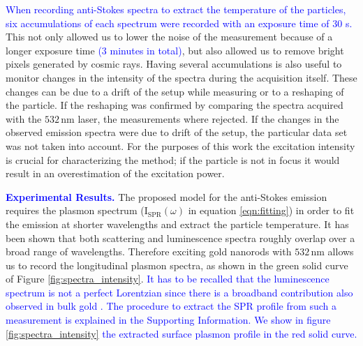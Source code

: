 \documentclass[journal=nalefd,manuscript=letter]{achemso}
\newcommand{\HI}[1]{\textcolor{blue}{#1}} %
\newcommand{\nm}{\ensuremath{\,\textrm{nm}}}
\begin{document}
\HI{When recording anti-Stokes spectra to extract the temperature of the
particles, six accumulations of each spectrum were recorded with an exposure 
time of $30$ s.} This not only allowed us to
lower the noise of the measurement because of a longer exposure time 
\HI{($3$ minutes in total)}, but also allowed us to remove bright pixels generated by cosmic rays. 
Having several accumulations is also useful to monitor changes in the intensity of the spectra
during the acquisition itself. These changes can be due to a drift of the setup
while measuring or to a reshaping of the particle. If the reshaping was
confirmed by comparing the spectra acquired with the $532\nm$
laser\cite{Liu2009}, the measurements where rejected. If the changes in the
observed emission spectra were due to drift of the setup, the particular data
set was not taken into account. For the purposes of this work the excitation
intensity is crucial for characterizing the method; if the particle is not in
focus it would result in an overestimation of the excitation power. 


\HI{\textbf{Experimental Results.}} The proposed model for the anti-Stokes emission requires the plasmon
spectrum ($\textrm{I}_{\textrm{SPR}}(\omega)$ in equation \ref{eqn:fitting}) 
in order to fit the emission at shorter wavelengths and extract the
particle temperature. It has been shown that both scattering and luminescence
spectra roughly overlap over a broad range of wavelengths\cite{Yorulmaz2012}. Therefore
exciting gold nanorods with $532\nm$ allows us to record the longitudinal
plasmon spectra, as shown in the green solid curve of Figure \ref{fig:spectra_intensity}. 
\HI{It has to be recalled that the luminescence spectrum is not a perfect
Lorentzian since there is a broadband contribution also observed in bulk gold \cite{Mooradian1969}.
The procedure to extract the SPR profile from such a measurement is explained in the
Supporting Information. We show in figure \ref{fig:spectra_intensity} the extracted 
surface plasmon profile in the red solid curve. }
\end{document}
